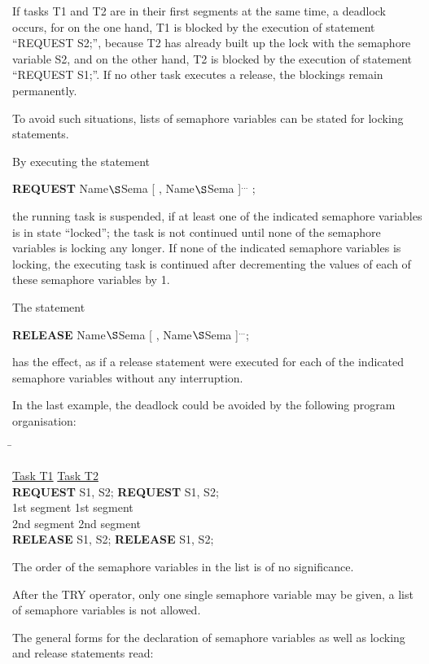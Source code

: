 If tasks T1 and T2 are in their first segments at the same time, a
deadlock occurs, for on the one hand, T1 is blocked by the execution of
statement ``REQUEST S2;'', because T2 has already built up the lock
with the semaphore variable S2, and on the other hand, T2 is blocked by
the execution of statement ``REQUEST S1;''. If no other task executes
a release, the blockings remain permanently.

To avoid such situations, lists of semaphore variables can be stated for
locking statements.

By executing the statement

{\bf REQUEST} Name$\S $Sema [ , Name$\S $Sema ]$^{...}$ ;

the running task is suspended, if at least one of the indicated semaphore
variables is in state ``locked''; the task is not continued until none
of the semaphore variables is locking any longer. If none of the
indicated semaphore variables is locking, the executing task is
continued after decrementing the values of each of these semaphore variables by
1.

The statement

{\bf RELEASE} Name$\S $Sema [ , Name$\S $Sema ]$^{...}$;

has the effect, as if a release statement were executed for each of
the indicated semaphore variables without any interruption.

In the last example, the deadlock could be avoided by the following
program organisation:

\begin{tabbing}
\hspace{6cm} \= \kill

\underline{Task T1}   \>       \underline{Task T2}   \\
{\bf REQUEST} S1, S2; \>       {\bf REQUEST} S1, S2; \\
\x 1st segment        \>       \x 1st segment        \\
\x 2nd segment        \>       \x 2nd segment        \\
{\bf RELEASE} S1, S2; \>       {\bf RELEASE} S1, S2;
\end{tabbing}

The order of the semaphore variables in the list is of no significance.

After the TRY operator, only one single semaphore variable may be
given, a list of semaphore variables is not allowed.

The general forms for the declaration of semaphore variables as well as
locking and release statements read:

